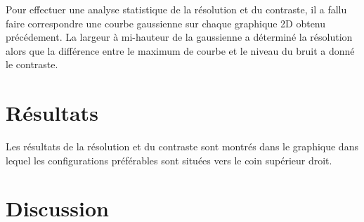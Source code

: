 \documentclass[conference]{IEEEtran}
\begin{document}
Pour effectuer une analyse statistique de la résolution et du contraste, il a fallu 
faire correspondre une courbe gaussienne sur chaque graphique 2D obtenu précédement. 
La largeur à mi-hauteur de la gaussienne a déterminé la résolution alors que la 
différence entre le maximum de courbe et le niveau du bruit a donné le contraste.







\section{Résultats}

Les résultats de la résolution et du contraste sont montrés dans le graphique 
\cite{rés-con} dans lequel les configurations préférables sont situées vers le 
coin supérieur droit. 


\section{Discussion}
\clearpage

% 
% 
\end{document}
